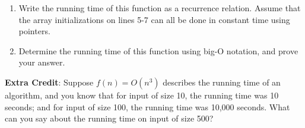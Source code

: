 \documentclass[12pt]{article}
\begin{document}
\noindent
\begin{enumerate}
\item Write the running time of this function as a recurrence relation.  Assume that the array initializations on lines 5-7 can all be done in constant time using pointers.
\item Determine the running time of this function using big-O notation, and prove your answer.\\
\end{enumerate}


\noindent
\textbf{Extra Credit}:  Suppose $f(n) = O(n^3)$ describes the running time of an algorithm, and you know that for input of size 10, the running time was 10 seconds; and for input of size 100, the running time was 10,000 seconds.  What can you say about the running time on input of size 500?\\

 
\end{document}
